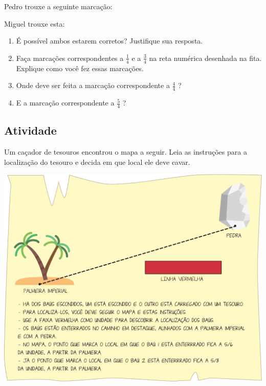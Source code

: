 Pedro trouxe a seguinte marcação: 

Miguel trouxe esta:

\begin{enumerate} [\quad a)] %
  \item     É possível ambos estarem corretos? Justifique sua resposta. 
  \item     Faça marcações correspondentes a     $\frac{1}{4}$     e a     $\frac{3}{4}$  na reta numérica desenhada na fita. Explique como você fez essas marcações.
  \item     Onde deve ser feita a marcação correspondente a     $\frac{4}{4}$    ? 
  \item     E a marcação correspondente a     $\frac{5}{4}$    ? 
\end{enumerate} %
  
\subsection{Atividade}

Um caçador de tesouros encontrou o mapa a seguir. Leia as instruções para a localização do tesouro e decida em que local ele deve cavar.

\noindent\includegraphics[width=\textwidth, keepaspectratio]{..//media//cap3/secoes/png/ativ7_fig01.png}  

